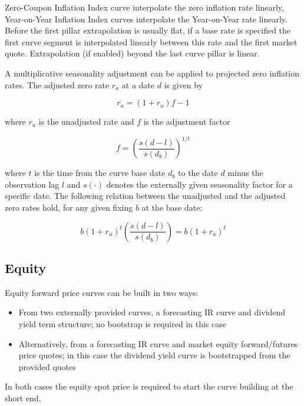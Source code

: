 Zero-Coupon Inflation Index curve interpolate the zero inflation rate linearly, Year-on-Year Inflation Index curves
interpolate the Year-on-Year rate linearly. Before the first pillar extrapolation is usually flat, if a base rate is
specified the first curve segment is interpolated linearly between this rate and the first market quote. Extrapolation
(if enabled) beyond the last curve pillar is linear.

A multiplicative seasonality adjustment can be applied to projected zero inflation rates. The adjusted zero rate $r_a$ at
a date $d$ is given by

\begin{equation}
  r_a = (1+r_u)f-1
\end{equation}

where $r_u$ is the unadjusted rate and $f$ is the adjustment factor

\begin{equation}
  f = \left( \frac{s(d-l)}{s(d_b)} \right) ^ {1/t}
\end{equation}

where $t$ is the time from the curve base date $d_b$ to the date $d$ minus the observation lag $l$ and $s(\cdot)$
denotes the externally given seasonality factor for a specific date. The following relation between the unadjusted and
the adjusted zero rates hold, for any given fixing $b$ at the base date:

\begin{equation}
b (1 + r_u) ^ t \left( \frac{s(d-l)}{s(d_b)} \right)  = b  ( 1 + r_a) ^ t
\end{equation}

\subsection{Equity}

Equity forward price curves can be built in two ways:
\begin{itemize}
\item From two externally provided curves, a forecasting IR curve and dividend 
yield term structure; no bootstrap is required in this case 
\item Alternatively, from a forecasting IR curve and market equity forward/futures 
price quotes; in this case the dividend yield curve is bootstrapped from the 
provided quotes
\end{itemize}

In both cases the equity spot price is required to start the curve building at the 
short end.


